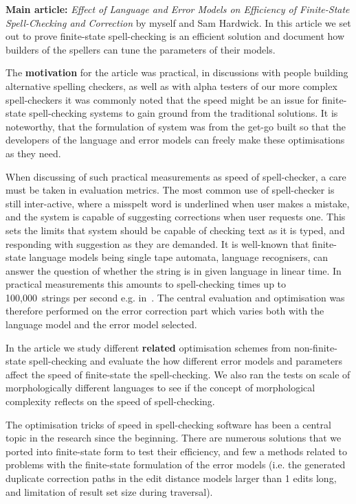 \documentclass[officiallayout]{unihelcompling}
\begin{document}
\textbf{Main article:} \emph{Effect of Language and Error Models on Efficiency
of Finite-State Spell-Checking and Correction} by myself and Sam Hardwick. In
this article we set out to prove finite-state spell-checking is an efficient
solution and document how builders of the spellers can tune the parameters
of their models.

The \textbf{motivation} for the article was practical, in discussions with
people building alternative spelling checkers, as well as with alpha testers of
our more complex spell-checkers it was commonly noted that the speed might be
an issue for finite-state spell-checking systems to gain ground from the
traditional solutions. It is noteworthy, that the formulation of system was
from the get-go built so that the developers of the language and error models
can freely make these optimisations as they need.

When discussing of such practical measurements as speed of spell-checker, a
care must be taken in evaluation metrics. The most common use of spell-checker
is still inter-active, where a misspelt word is underlined when user makes a
mistake, and the system is capable of suggesting corrections when user requests
one. This sets the limits that system should be capable of checking text as it
is typed, and responding with suggestion as they are demanded. It is well-known
that finite-state language models being single tape automata, language
recognisers, can answer the question of whether the string is in given language
in linear time. In practical measurements this amounts to spell-checking times
up to 100,000~strings per second e.g. in~\citet{silfverberg2009hfst}. The
central evaluation and optimisation was therefore performed on the error
correction part which varies both with the language model and the error model
selected.

In the article we study different \textbf{related} optimisation schemes from
non-finite-state spell-checking and evaluate the how different error models and
parameters affect the speed of finite-state the spell-checking. We also ran the
tests on scale of morphologically different languages to see if the concept of
morphological complexity reflects on the speed of spell-checking.

The optimisation tricks of speed in spell-checking software has been a central
topic in the research since the beginning. There are numerous solutions that we
ported into finite-state form to test their efficiency, and few a methods
related to problems with the finite-state formulation of the error models (i.e.
the generated duplicate correction paths in the edit distance models larger
than 1 edits long, and limitation of result set size during traversal).
\end{document}
